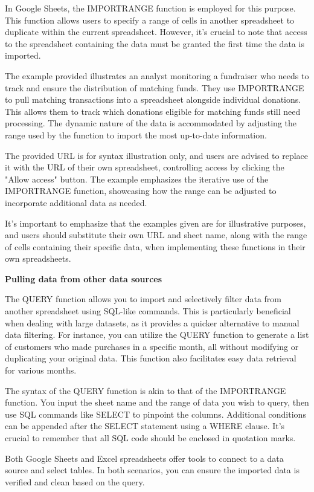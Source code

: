 \documentclass[]{article}
\begin{document}
In Google Sheets, the IMPORTRANGE function is employed for this purpose. This function allows users to specify a range of cells in another spreadsheet to duplicate within the current spreadsheet. However, it's crucial to note that access to the spreadsheet containing the data must be granted the first time the data is imported.

The example provided illustrates an analyst monitoring a fundraiser who needs to track and ensure the distribution of matching funds. They use IMPORTRANGE to pull matching transactions into a spreadsheet alongside individual donations. This allows them to track which donations eligible for matching funds still need processing. The dynamic nature of the data is accommodated by adjusting the range used by the function to import the most up-to-date information.

The provided URL is for syntax illustration only, and users are advised to replace it with the URL of their own spreadsheet, controlling access by clicking the "Allow access" button. The example emphasizes the iterative use of the IMPORTRANGE function, showcasing how the range can be adjusted to incorporate additional data as needed.

It's important to emphasize that the examples given are for illustrative purposes, and users should substitute their own URL and sheet name, along with the range of cells containing their specific data, when implementing these functions in their own spreadsheets.

\textbf{Pulling data from other data sources}

The QUERY function allows you to import and selectively filter data from another spreadsheet using SQL-like commands. This is particularly beneficial when dealing with large datasets, as it provides a quicker alternative to manual data filtering. For instance, you can utilize the QUERY function to generate a list of customers who made purchases in a specific month, all without modifying or duplicating your original data. This function also facilitates easy data retrieval for various months.

The syntax of the QUERY function is akin to that of the IMPORTRANGE function. You input the sheet name and the range of data you wish to query, then use SQL commands like SELECT to pinpoint the columns. Additional conditions can be appended after the SELECT statement using a WHERE clause. It's crucial to remember that all SQL code should be enclosed in quotation marks.

Both Google Sheets and Excel spreadsheets offer tools to connect to a data source and select tables. In both scenarios, you can ensure the imported data is verified and clean based on the query.
\end{document}

